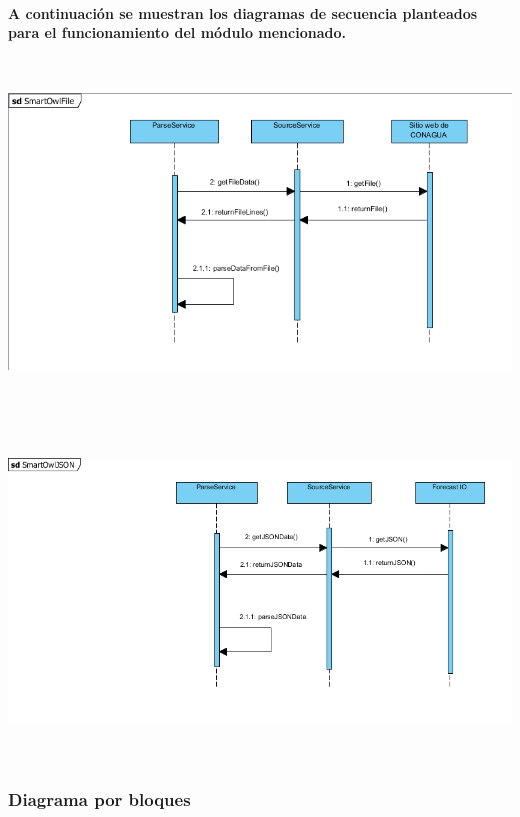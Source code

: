     \paragraph{A continuación se muestran los diagramas de secuencia planteados para el funcionamiento del módulo mencionado.}
    \begin{center}
      \includegraphics[width=14cm,height=9cm]{./images/SmartOwlSequenceDiagram}
    \end{center}
    \begin{center}
      \includegraphics[width=14cm,height=9cm]{./images/SmartOwlSequenceDiagram2}
    \end{center}
    \subsubsection{Diagrama por bloques}
